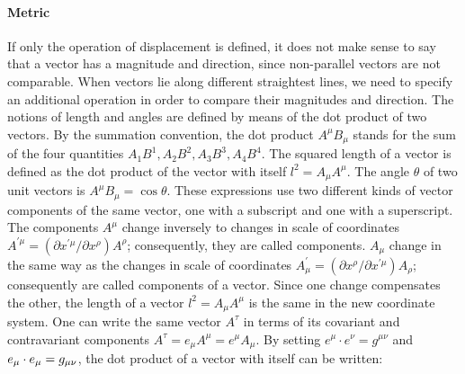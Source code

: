 \documentclass[submitted]{article}
\begin{document}
\paragraph{Metric} If only the operation of displacement is defined, it does not make sense to say that a vector has a magnitude and direction, since non-parallel vectors are not comparable. When vectors lie along different straightest lines, we need to specify an additional operation in order to compare their magnitudes and direction. The notions of length and angles are defined by means of the dot product of two vectors. By the summation convention, the dot product $A^\mu B_\mu$ stands for the sum of the four quantities $A_{1} B^{1}, A_{2} B^{2}, A_{3} B^{3}, A_{4} B^{4}$. The squared length of a vector is defined as the dot product of the vector with itself $l^2 = A_{\mu} A^{\mu}$. The angle $\theta$ of two unit vectors is $A^\mu B_\mu = \cos{\theta}$. These expressions use two different kinds of vector components of the same vector, one with a subscript and one with a superscript. The components $A^\mu$ change inversely to changes in scale of coordinates $A^{\prime \mu}=\left(\partial x^{\prime \mu} / \partial x^{\rho}\right) A^{\rho}$; consequently, they are called  components. $A_\mu$ change in the same way as the changes in scale of coordinates $A_{\mu}^{\prime}=\left(\partial x^{\rho} / \partial x^{\prime \mu}\right) A_{\rho}$; consequently are called  components of a vector. Since one change compensates the other, the length of a vector $l^2 = A_{\mu} A^{\mu}$ is the same in the new coordinate system. One can write the same vector $A^\tau$ in terms of its covariant and contravariant components $A^\tau= e_\mu A^\mu = e^\mu A_\mu$. By setting $e^\mu \cdot e^\nu = g^{\mu\nu}$ and $e_\mu \cdot e_\mu = g_{\mu\nu}$, the dot product of a vector with itself can be written:
 
\end{document}
